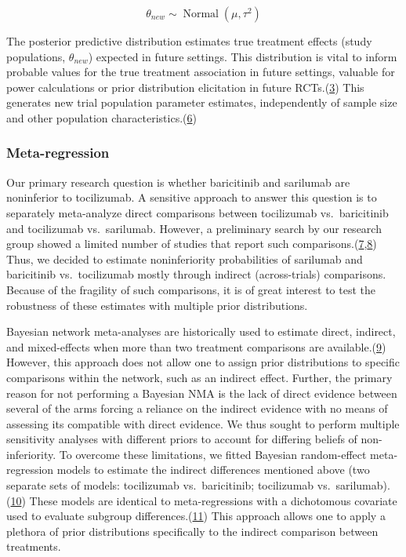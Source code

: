 \documentclass[
  12pt,
]{article}
\begin{document}
\[\theta_{new} \sim \operatorname{Normal}(\mu, \tau^2)\]

The posterior predictive distribution estimates true treatment effects
(study populations, \(\theta_{new}\)) expected in future settings. This
distribution is vital to inform probable values for the true treatment
association in future settings, valuable for power calculations or prior
distribution elicitation in future
RCTs.(\protect\hyperlink{ref-spiegelhalter2004}{3}) This generates new
trial population parameter estimates, independently of sample size and
other population
characteristics.(\protect\hyperlink{ref-higgins2009}{6})

\hypertarget{meta-regression}{%
\subsubsection{Meta-regression}\label{meta-regression}}

Our primary research question is whether baricitinib and sarilumab are
noninferior to tocilizumab. A sensitive approach to answer this question
is to separately meta-analyze direct comparisons between tocilizumab
vs.~baricitinib and tocilizumab vs.~sarilumab. However, a preliminary
search by our research group showed a limited number of studies that
report such
comparisons.(\protect\hyperlink{ref-zotero-3144}{7},\protect\hyperlink{ref-karampitsakos2022}{8})
Thus, we decided to estimate noninferiority probabilities of sarilumab
and baricitinib vs.~tocilizumab mostly through indirect (across-trials)
comparisons. Because of the fragility of such comparisons, it is of
great interest to test the robustness of these estimates with multiple
prior distributions.

Bayesian network meta-analyses are historically used to estimate direct,
indirect, and mixed-effects when more than two treatment comparisons are
available.(\protect\hyperlink{ref-dias2018}{9}) However, this approach
does not allow one to assign prior distributions to specific comparisons
within the network, such as an indirect effect. Further, the primary
reason for not performing a Bayesian NMA is the lack of direct evidence
between several of the arms forcing a reliance on the indirect evidence
with no means of assessing its compatible with direct evidence. We thus
sought to perform multiple sensitivity analyses with different priors to
account for differing beliefs of non-inferiority. To overcome these
limitations, we fitted Bayesian random-effect meta-regression models to
estimate the indirect differences mentioned above (two separate sets of
models: tocilizumab vs.~baricitinib; tocilizumab
vs.~sarilumab).(\protect\hyperlink{ref-pitchforth2012}{10}) These models
are identical to meta-regressions with a dichotomous covariate used to
evaluate subgroup differences.(\protect\hyperlink{ref-thompson2002}{11})
This approach allows one to apply a plethora of prior distributions
specifically to the indirect comparison between treatments.
\end{document}

